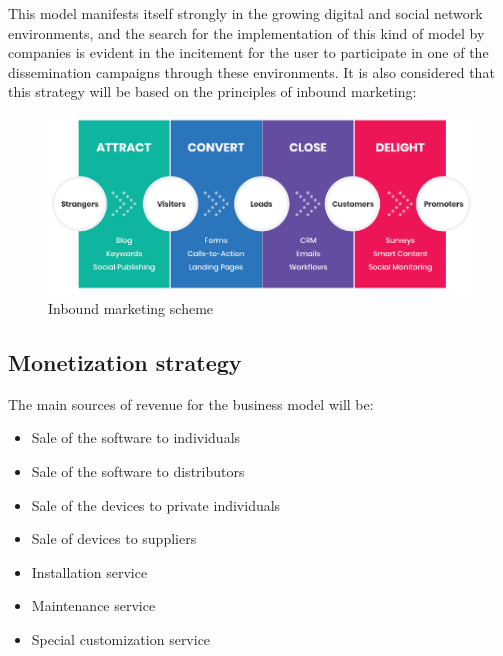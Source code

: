 \documentclass[11pt,a4paper]{article}
\begin{document}
\newpage

This model manifests itself strongly in the growing digital and social network environments, and the search for the implementation of this kind of model by companies is evident in the incitement for the user to participate in one of the dissemination campaigns through these environments. It is also considered that this strategy will be based on the principles of inbound marketing:\\
\begin{figure}[hbtp]
\centering
\includegraphics[scale=1]{figures/marketing.png}
\caption{Inbound marketing scheme}
\end{figure}

\subsection{Monetization strategy}
The main sources of revenue for the business model will be: 
\begin{itemize}
\item Sale of the software to individuals
\item Sale of the software to distributors
\item Sale of the devices to private individuals
\item Sale of devices to suppliers
\item Installation service
\item Maintenance service
\item Special customization service
\end{itemize}
\end{document}
